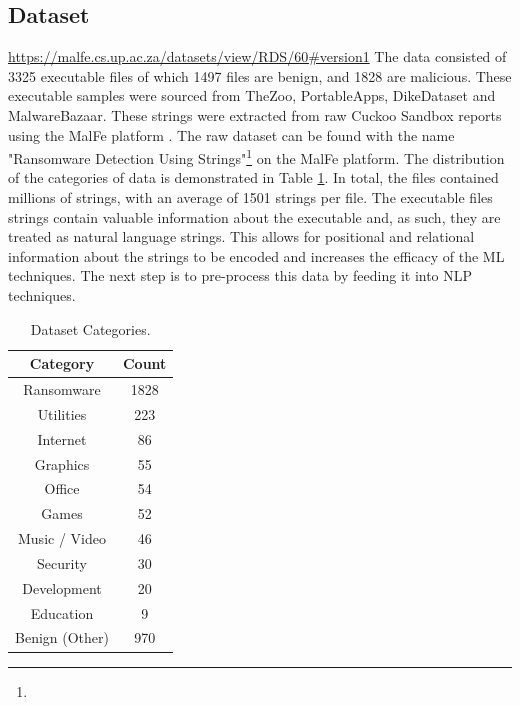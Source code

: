 \documentclass[conference]{IEEEtran}
\begin{document}
\subsection{Dataset}
\urldef{\dataset}\url{https://malfe.cs.up.ac.za/datasets/view/RDS/60#version1}
The data consisted of 3325 executable files of which 1497 files are benign, and 1828 are malicious. These executable samples were sourced from TheZoo, PortableApps, DikeDataset and MalwareBazaar. These strings were extracted from raw Cuckoo Sandbox reports using the MalFe platform \cite{malfe}. The raw dataset can be found with the name "Ransomware Detection Using Strings"\footnote{\dataset} on the MalFe platform. The distribution of the categories of data is demonstrated in Table \ref{tab:datasetCat}. In total, the files contained millions of strings, with an average of 1501 strings per file. The executable files strings contain valuable information about the executable and, as such, they are treated as natural language strings. This allows for positional and relational information about the strings to be encoded and increases the efficacy of the ML techniques. The next step is to pre-process this data by feeding it into NLP techniques. 
\begin{table}[H]
 \begin{center}
 \caption{\label{tab:datasetCat} Dataset Categories.}
\begin{tabular}{|c|c|}
 \hline
\textbf{Category} & \textbf{Count} \\\hline 
Ransomware       & 1828 \\\hline
Utilities        & 223 \\\hline
Internet         & 86 \\\hline
Graphics         & 55 \\\hline
Office           & 54 \\\hline
Games            & 52 \\\hline
Music / Video    & 46 \\\hline
Security         & 30 \\\hline
Development      & 20 \\\hline
Education        &  9 \\\hline
Benign (Other)   & 970 \\\hline
\end{tabular}
 \end{center}

\end{table}
\end{document}
